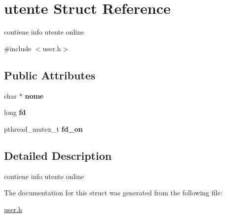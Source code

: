 \hypertarget{structutente}{}\section{utente Struct Reference}
\label{structutente}


contiene info utente online  




{\ttfamily \#include $<$user.\+h$>$}

\subsection*{Public Attributes}
\begin{DoxyCompactItemize}
\item 
char $\ast$ {\bfseries nome}\hypertarget{structutente_a39ef97f9f3101db4c4274c5c2cfb6b20}{}\label{structutente_a39ef97f9f3101db4c4274c5c2cfb6b20}

\item 
long {\bfseries fd}\hypertarget{structutente_a0f192949a694127494ac253a491f3187}{}\label{structutente_a0f192949a694127494ac253a491f3187}

\item 
pthread\+\_\+mutex\+\_\+t {\bfseries fd\+\_\+on}\hypertarget{structutente_a84d6871519cf535b046ae8fae25d9f3b}{}\label{structutente_a84d6871519cf535b046ae8fae25d9f3b}

\end{DoxyCompactItemize}


\subsection{Detailed Description}
contiene info utente online 

The documentation for this struct was generated from the following file\+:\begin{DoxyCompactItemize}
\item 
\hyperlink{user_8h}{user.\+h}\end{DoxyCompactItemize}
